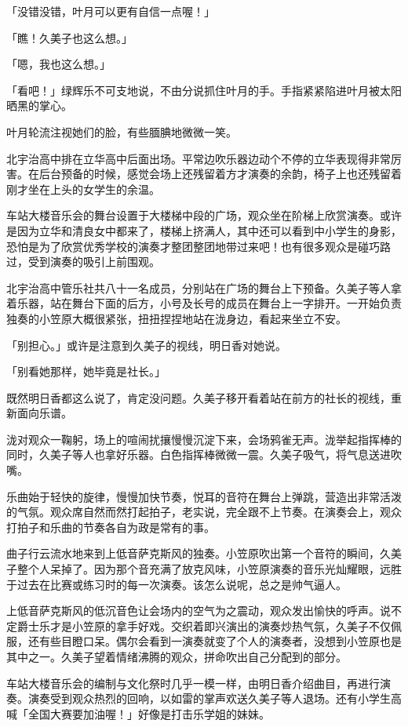 \documentclass[UTF8]{ctexart}
\begin{document}
    「没错没错，叶月可以更有自信一点喔！」 

    「瞧！久美子也这么想。」 

    「嗯，我也这么想。」 

    「看吧！」绿辉乐不可支地说，不由分说抓住叶月的手。手指紧紧陷进叶月被太阳晒黑的掌心。 

    叶月轮流注视她们的脸，有些腼腆地微微一笑。 

    北宇治高中排在立华高中后面出场。平常边吹乐器边动个不停的立华表现得非常厉害。在后台预备的时候，感觉会场上还残留着方才演奏的余韵，椅子上也还残留着刚才坐在上头的女学生的余温。 

    车站大楼音乐会的舞台设置于大楼梯中段的广场，观众坐在阶梯上欣赏演奏。或许是因为立华和清良女中都来了，楼梯上挤满人，其中还可以看到中小学生的身影，恐怕是为了欣赏优秀学校的演奏才整团整团地带过来吧！也有很多观众是碰巧路过，受到演奏的吸引上前围观。 

    北宇治高中管乐社共八十一名成员，分别站在广场的舞台上下预备。久美子等人拿着乐器，站在舞台下面的后方，小号及长号的成员在舞台上一字排开。一开始负责独奏的小笠原大概很紧张，扭扭捏捏地站在泷身边，看起来坐立不安。 

    「别担心。」或许是注意到久美子的视线，明日香对她说。 

    「别看她那样，她毕竟是社长。」 

    既然明日香都这么说了，肯定没问题。久美子移开看着站在前方的社长的视线，重新面向乐谱。 

    泷对观众一鞠躬，场上的喧闹扰攘慢慢沉淀下来，会场鸦雀无声。泷举起指挥棒的同时，久美子等人也拿好乐器。白色指挥棒微微一震。久美子吸气，将气息送进吹嘴。 

    乐曲始于轻快的旋律，慢慢加快节奏，悦耳的音符在舞台上弹跳，营造出非常活泼的气氛。观众席自然而然打起拍子，老实说，完全跟不上节奏。在演奏会上，观众打拍子和乐曲的节奏各自为政是常有的事。 

    曲子行云流水地来到上低音萨克斯风的独奏。小笠原吹出第一个音符的瞬间，久美子整个人呆掉了。因为那个音充满了放克风味，小笠原演奏的音乐光灿耀眼，远胜于过去在比赛或练习时的每一次演奏。该怎么说呢，总之是帅气逼人。 

    上低音萨克斯风的低沉音色让会场内的空气为之震动，观众发出愉快的呼声。说不定爵士乐才是小笠原的拿手好戏。交织着即兴演出的演奏炒热气氛，久美子不仅佩服，还有些目瞪口呆。偶尔会看到一演奏就变了个人的演奏者，没想到小笠原也是其中之一。久美子望着情绪沸腾的观众，拼命吹出自己分配到的部分。 

    车站大楼音乐会的编制与文化祭时几乎一模一样，由明日香介绍曲目，再进行演奏。演奏受到观众热烈的回响，以如雷的掌声欢送久美子等人退场。还有小学生高喊「全国大赛要加油喔！」好像是打击乐学姐的妹妹。 
\end{document}
